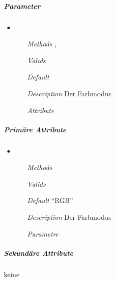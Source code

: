 \subparagraph{Parameter}
\begin{itemize}

\item {}
\begin{enumerate}
\item[\textit{Methods}]
,
\item[\textit{Valids}] 
\item[\textit{Default}] 
\item[\textit{Description}] Der Farbmodus
\item[\textit{Attribute}] 
\end{enumerate}

\end{itemize}


\newpage

\subparagraph{Prim\"are Attribute}
\begin{itemize}

\item {}
\begin{enumerate}
\item[\textit{Methods}] 
\item[\textit{Valids}] 
\item[\textit{Default}] ``RGB''
\item[\textit{Description}] Der Farbmodus
\item[\textit{Parametre}] 
\end{enumerate}

\end{itemize}


\newpage

\subparagraph{Sekund\"are Attribute}
keine


\newpage

